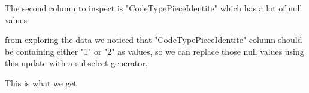 The second column to inspect is "CodeTypePieceIdentite" which has a lot of null values
\begin{figure}[H]
\centering
{}
\end{figure}

\clearpage

from exploring the data we noticed that "CodeTypePieceIdentite" column should be containing either "1" or "2" as values, so we can replace those null values using this update with a subselect generator,
\begin{figure}[H]
\centering
{}
\end{figure}

This is what we get
\begin{figure}[H]
\centering
{}
\end{figure}

